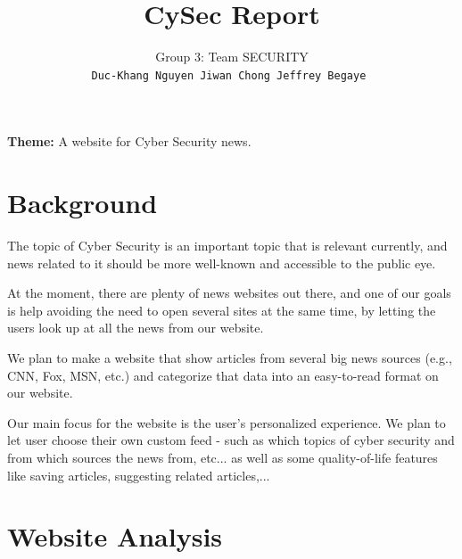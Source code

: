 \documentclass{article}
\title{CySec Report}
\author{
Group 3: Team SECURITY\\
\texttt{Duc-Khang Nguyen \hspace{0.3in} Jiwan Chong \hspace{0.3in} Jeffrey Begaye }
}
\begin{document}
\maketitle

\textbf{Theme:} A website for Cyber Security news.

\section{Background}

The topic of Cyber Security is an important topic that is relevant currently, and news related to it should be more well-known and accessible to the public eye.

At the moment, there are plenty of news websites out there, and one of our goals is help avoiding the need to open several sites at the same time, by letting the users look up at all the news from our website. 

We plan to make a website that show articles from several big news sources (e.g., CNN, Fox, MSN, etc.) and categorize that data into an easy-to-read format on our website. 

Our main focus for the website is the user's personalized experience. We plan to let user choose their own custom feed - such as which topics of cyber security and from which sources the news from, etc... as well as some quality-of-life features like saving articles, suggesting related articles,...


\section{Website Analysis}
\end{document}
